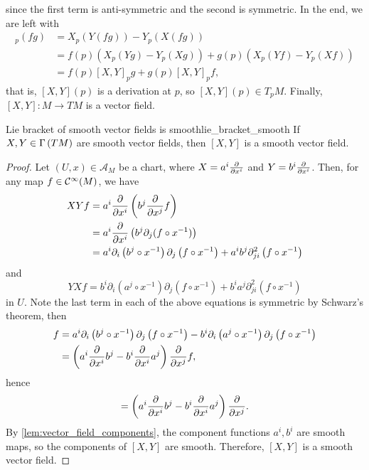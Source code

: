 since the first term is anti-symmetric and the second is symmetric. In the end, we are left with
\begin{align*}
    [X,Y]_p(fg) &= X_p(Y(fg)) - Y_p(X(fg))\\
                &= f(p) \left(X_p(Yg) - Y_p (Xg)\right) + g(p) \left(X_p(Yf) - Y_p(Xf)\right)\\
                &= f(p) [X,Y]_pg + g(p)[X,Y]_pf,
\end{align*}
that is, \([X,Y](p)\) is a derivation at \(p\), so \([X,Y](p) \in T_pM\). Finally, \([X,Y] : M \to TM\) is a vector field.

\begin{theorem}{Lie bracket of smooth vector fields is smooth}{lie_bracket_smooth}
    If \(X, Y \in \Gamma\left(TM\right)\) are smooth vector fields, then \([X,Y]\) is a smooth vector field.
\end{theorem}
\begin{proof}
    Let \((U, x) \in \mathscr{A}_M\) be a chart, where \(X = a^i \bfield{x^i}\) and \(Y = b^i \bfield{x^i}\). Then, for any map \(f \in \mathcal{C}^\infty(M)\), we have
    \begin{align*}
        XYf &= a^i \bfield{x^i}\left(b^j \bfield{x^j} f\right)\\
            &= a^i \bfield{x^i}\left(b^j\partial_j(f \circ x^{-1})\right)\\
            &= a^i \partial_i\left(b^j\circ x^{-1}\right) \partial_j\left(f \circ x^{-1}\right) + a^i b^j \partial^2_{ji} \left(f \circ x^{-1}\right)
    \end{align*}
    and
    \begin{equation*}
        YXf = b^i \partial_i\left(a^j\circ x^{-1}\right) \partial_j\left(f \circ x^{-1}\right) + b^i a^j \partial^2_{ji} \left(f \circ x^{-1}\right)
    \end{equation*}
    in \(U\). Note the last term in each of the above equations is symmetric by Schwarz's theorem, then
    \begin{align*}
        [X,Y]f &=a^i \partial_i\left(b^j\circ x^{-1}\right) \partial_j\left(f \circ x^{-1}\right)  -  b^i \partial_i\left(a^j\circ x^{-1}\right) \partial_j\left(f \circ x^{-1}\right)\\
               &= \left(a^i \bfield{x^i} b^j - b^i \bfield{x^i}a^j\right)\bfield{x^j}f,
    \end{align*}
    hence
    \begin{equation*}
        [X,Y] = \left(a^i \bfield{x^i} b^j - b^i \bfield{x^i}a^j\right)\bfield{x^j}.
    \end{equation*}
    By \cref{lem:vector_field_components}, the component functions \(a^i, b^i\) are smooth maps, so the components of \([X,Y]\) are smooth. Therefore, \([X,Y]\) is a smooth vector field.
\end{proof}

